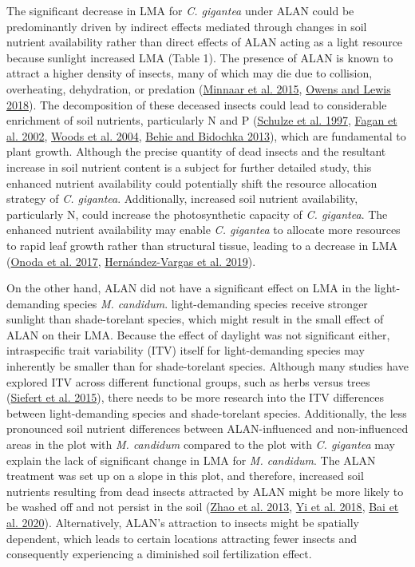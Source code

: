 \documentclass[
  12pt,
  letterpaper,
  DIV=11,
  numbers=noendperiod]{scrartcl}
\begin{document}
The significant decrease in LMA for \emph{C. gigantea} under ALAN could
be predominantly driven by indirect effects mediated through changes in
soil nutrient availability rather than direct effects of ALAN acting as
a light resource because sunlight increased LMA (Table 1). The presence
of ALAN is known to attract a higher density of insects, many of which
may die due to collision, overheating, dehydration, or predation
(\protect\hyperlink{ref-Minnaar2015}{Minnaar et al. 2015},
\protect\hyperlink{ref-Owens2018}{Owens and Lewis 2018}). The
decomposition of these deceased insects could lead to considerable
enrichment of soil nutrients, particularly N and P
(\protect\hyperlink{ref-Schulze1997}{Schulze et al. 1997},
\protect\hyperlink{ref-Fagan2002}{Fagan et al. 2002},
\protect\hyperlink{ref-Woods2004}{Woods et al. 2004},
\protect\hyperlink{ref-Behie2013}{Behie and Bidochka 2013}), which are
fundamental to plant growth. Although the precise quantity of dead
insects and the resultant increase in soil nutrient content is a subject
for further detailed study, this enhanced nutrient availability could
potentially shift the resource allocation strategy of \emph{C.
gigantea}. Additionally, increased soil nutrient availability,
particularly N, could increase the photosynthetic capacity of \emph{C.
gigantea}. The enhanced nutrient availability may enable \emph{C.
gigantea} to allocate more resources to rapid leaf growth rather than
structural tissue, leading to a decrease in LMA
(\protect\hyperlink{ref-Onoda2017}{Onoda et al. 2017},
\protect\hyperlink{ref-Hernandez-Vargas2019}{Hernández-Vargas et al.
2019}).

On the other hand, ALAN did not have a significant effect on LMA in the
light-demanding species \emph{M. candidum}. light-demanding species
receive stronger sunlight than shade-torelant species, which might
result in the small effect of ALAN on their LMA. Because the effect of
daylight was not significant either, intraspecific trait variability
(ITV) itself for light-demanding species may inherently be smaller than
for shade-torelant species. Although many studies have explored ITV
across different functional groups, such as herbs versus trees
(\protect\hyperlink{ref-Siefert2015}{Siefert et al. 2015}), there needs
to be more research into the ITV differences between light-demanding
species and shade-torelant species. Additionally, the less pronounced
soil nutrient differences between ALAN-influenced and non-influenced
areas in the plot with \emph{M. candidum} compared to the plot with
\emph{C. gigantea} may explain the lack of significant change in LMA for
\emph{M. candidum}. The ALAN treatment was set up on a slope in this
plot, and therefore, increased soil nutrients resulting from dead
insects attracted by ALAN might be more likely to be washed off and not
persist in the soil (\protect\hyperlink{ref-Zhao2013}{Zhao et al. 2013},
\protect\hyperlink{ref-Yi2018}{Yi et al. 2018},
\protect\hyperlink{ref-Bai2020}{Bai et al. 2020}). Alternatively, ALAN's
attraction to insects might be spatially dependent, which leads to
certain locations attracting fewer insects and consequently experiencing
a diminished soil fertilization effect.
\end{document}

